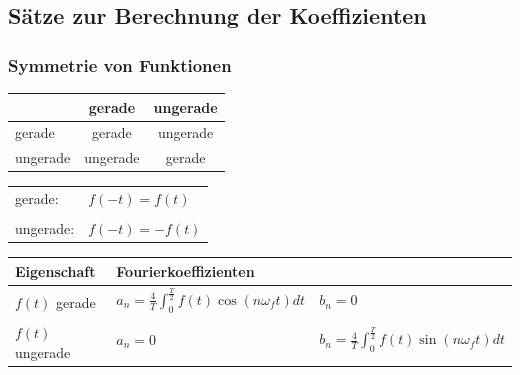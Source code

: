 \columnbreak


\subsection{Sätze zur Berechnung der Koeffizienten}

\subsubsection{Symmetrie von Funktionen}

\begin{minipage}{0.48\linewidth}
    \begin{tabular}{l | c | c}
                 & gerade   & ungerade \\
        \hline
        gerade   & gerade   & ungerade \\
        \hline
        ungerade & ungerade & gerade   \\
    \end{tabular}
\end{minipage}
\hfill
\begin{minipage}{0.43\linewidth}
    \begin{tabular}{ll}

        gerade:   & $f(-t) = f(t)$   \\
        \\
        ungerade: & $f(-t) = - f(t)$
    \end{tabular}
\end{minipage}

\smallskip
\renewcommand{\arraystretch}{2}
\begin{tabular}{l|l|l}
    \textbf{Eigenschaft}             & \multicolumn{2}{l}{\textbf{Fourierkoeffizienten}}                                                                                                                         \\ \hline
    \multirow{2}{*}{$f(t)$ gerade}   & $\displaystyle a_n = \frac{4}{T} \int_{0}^{\frac{T}{2}} f(t) \cos(n \omega_f t) dt$ & $b_n = 0$                                                                           \\
                                     & \color{blue}{$\text{Im}(c_k) = 0$}                                                  & \color{blue}{$c_n = \frac{a_n}{2}$ (reell)}                                         \\ \hline
    \multirow{2}{*}{$f(t)$ ungerade} & $\displaystyle a_n = 0$                                                             & $\displaystyle b_n = \frac{4}{T} \int_{0}^{\frac{T}{2}} f(t) \sin(n \omega_f t) dt$ \\
                                     & \color{blue}{$\text{Re}(c_k) = 0$}                                                  & \color{blue}{$c_n = j \frac{b_n}{2}$ (imaginär)}                                    \\ \hline
\end{tabular}
\renewcommand{\arraystretch}{1}

